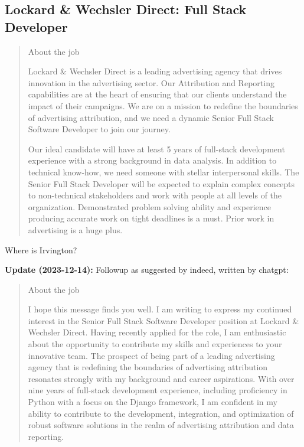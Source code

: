 \documentclass[
	letterpaper, %
	12pt, %
]{CSSullivanBusinessReport}
\begin{document}

\subsection[Lockard \& Wechsler Direct]{Lockard \& Wechsler Direct: Full Stack Developer }

\begin{quote}
	About the job
	
	Lockard \& Wechsler Direct is a leading advertising agency that drives innovation in the advertising sector. Our Attribution and Reporting capabilities are at the heart of ensuring that our clients understand the impact of their campaigns. We are on a mission to redefine the boundaries of advertising attribution, and we need a dynamic Senior Full Stack Software Developer to join our journey.

	Our ideal candidate will have at least 5 years of full-stack development experience with a strong background in data analysis. In addition to technical know-how, we need someone with stellar interpersonal skills. The Senior Full Stack Developer will be expected to explain complex concepts to non-technical stakeholders and work with people at all levels of the organization. Demonstrated problem solving ability and experience producing accurate work on tight deadlines is a must. Prior work in advertising is a huge plus.

\end{quote}

Where is Irvington?

\textbf{Update (2023-12-14):} Followup as suggested by indeed, written by chatgpt:

\begin{quote}
	About the job
	
	I hope this message finds you well. I am writing to express my continued interest in the Senior Full Stack Software Developer position at Lockard \& Wechsler Direct. Having recently applied for the role, I am enthusiastic about the opportunity to contribute my skills and experiences to your innovative team. The prospect of being part of a leading advertising agency that is redefining the boundaries of advertising attribution resonates strongly with my background and career aspirations. With over nine years of full-stack development experience, including proficiency in Python with a focus on the Django framework, I am confident in my ability to contribute to the development, integration, and optimization of robust software solutions in the realm of advertising attribution and data reporting.

\end{quote}
\end{document}
